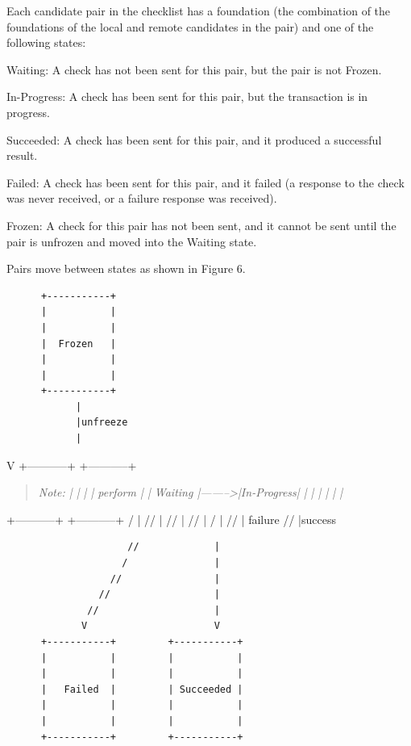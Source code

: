 \documentclass{article}
\begin{document}
Each candidate pair in the checklist has a foundation (the combination of the foundations of the local and remote candidates in the pair) and one of the following states:

Waiting:  A check has not been sent for this pair, but the pair is not Frozen.

In-Progress:  A check has been sent for this pair, but the transaction is in progress.

Succeeded:  A check has been sent for this pair, and it produced a successful result.

Failed:  A check has been sent for this pair, and it failed (a response to the check was never received, or a failure response was received).

Frozen:  A check for this pair has not been sent, and it cannot be sent until the pair is unfrozen and moved into the Waiting state.

Pairs move between states as shown in Figure 6.

\begin{verbatim}
      +-----------+
      |           |
      |           |
      |  Frozen   |
      |           |
      |           |
      +-----------+
            |
            |unfreeze
            |
\end{verbatim}

V +-----------+         +-----------+

\begin{quote}
\textit{Note: |         |           | | perform |           | Waiting  |-------->|In-Progress| |         |           | |         |           |}
\end{quote}

+-----------+         +-----------+ / | //  | //    | //      | /        | //         | failure //           |success

\begin{verbatim}
                     //             |
                    /               |
                  //                |
                //                  |
              //                    |
             V                      V
      +-----------+         +-----------+
      |           |         |           |
      |           |         |           |
      |   Failed  |         | Succeeded |
      |           |         |           |
      |           |         |           |
      +-----------+         +-----------+

\end{verbatim}
\end{document}
